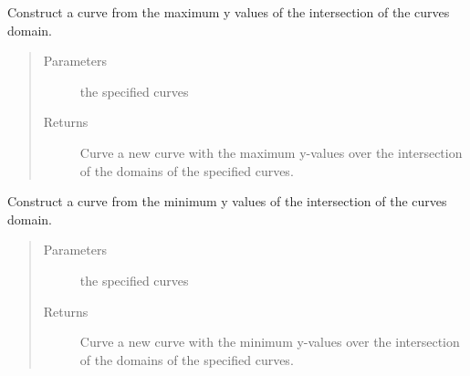 \documentclass[letterpaper,10pt,english]{sphinxmanual}
\begin{document}
\begin{fulllineitems}
\label{\detokenize{pydv:pydvpy.max_curve}}
Construct a curve from the maximum y values of the intersection of the curves domain.
\begin{quote}\begin{description}
\item[{Parameters}] \leavevmode
{} \textendash{} the specified curves

\item[{Returns}] \leavevmode
Curve \textendash{} a new curve with the maximum y-values over the intersection of the domains of the specified curves.

\end{description}\end{quote}

\end{fulllineitems}


\begin{fulllineitems}
\label{\detokenize{pydv:pydvpy.min_curve}}
Construct a curve from the minimum y values of the intersection of the curves domain.
\begin{quote}\begin{description}
\item[{Parameters}] \leavevmode
{} \textendash{} the specified curves

\item[{Returns}] \leavevmode
Curve \textendash{} a new curve with the minimum y-values over the intersection of the domains of the specified curves.

\end{description}\end{quote}

\end{fulllineitems}

\end{document}
